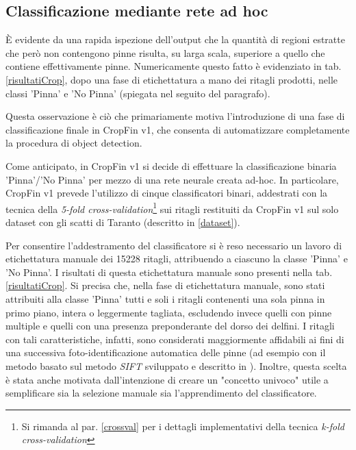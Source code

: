 \subsection*{Classificazione mediante rete ad hoc}
È evidente da una rapida ispezione dell'output che la quantità di regioni estratte che però non contengono pinne risulta, su larga scala, superiore a quello che contiene effettivamente pinne. Numericamente questo fatto è evidenziato in tab. \ref{risultatiCrop}, dopo una fase di etichettatura a mano dei ritagli prodotti, nelle classi 'Pinna' e 'No Pinna' (spiegata nel seguito del paragrafo).

Questa osservazione è ciò che primariamente motiva l’introduzione di una fase di classificazione finale in CropFin v1, che consenta di automatizzare completamente la procedura di object detection.

Come anticipato, in CropFin v1 si decide di effettuare la classificazione binaria 'Pinna'/'No Pinna' per mezzo di una rete neurale creata ad-hoc. In particolare, CropFin v1 prevede l'utilizzo di cinque classificatori binari, addestrati con la tecnica della \textit{5-fold cross-validation}\footnote{Si rimanda al par. \ref{crossval} per i dettagli implementativi della tecnica \textit{k-fold cross-validation}}
sui ritagli restituiti da CropFin v1 sul solo dataset con gli scatti di Taranto (descritto in \ref{dataset}).

Per consentire l'addestramento del classificatore si è reso necessario un lavoro di etichettatura manuale dei 15228 ritagli, attribuendo a ciascuno la classe 'Pinna' e 'No Pinna'. I risultati di questa etichettatura manuale sono presenti nella tab. \ref{risultatiCrop}.
Si precisa che, nella fase di etichettatura manuale, sono stati attribuiti alla classe 'Pinna' tutti e soli i ritagli contenenti una sola pinna in primo piano, intera o leggermente tagliata, escludendo invece quelli con pinne multiple e quelli con una presenza preponderante del dorso dei delfini. I ritagli con tali caratteristiche, infatti, sono considerati maggiormente affidabili ai fini di una successiva foto-identificazione automatica delle pinne (ad esempio con il metodo basato sul metodo \textit{SIFT} sviluppato e descritto in \cite{emanuele}). Inoltre, questa scelta è stata anche motivata dall’intenzione di creare un "concetto univoco" utile a semplificare sia la selezione manuale sia l’apprendimento del classificatore.


